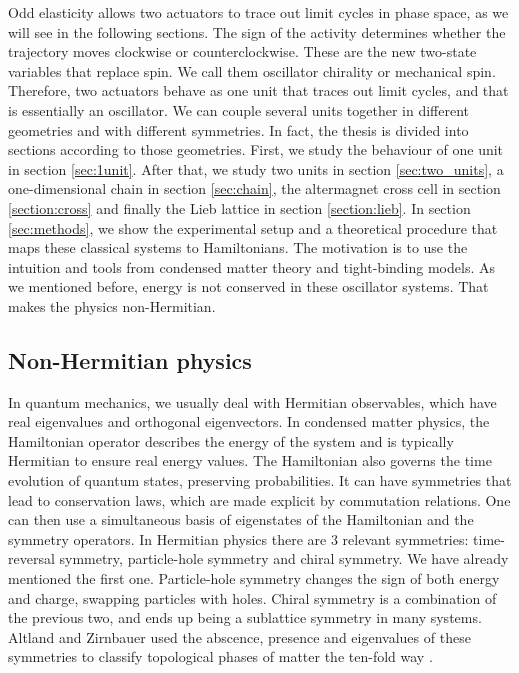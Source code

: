 \documentclass[11pt, a4paper]{article} %
\begin{document}
Odd elasticity allows two actuators to trace out limit cycles in phase space, as we will see in the following sections.
The sign of the activity determines whether the trajectory moves clockwise or counterclockwise. 
These are the new two-state variables that replace spin. We call them oscillator chirality or mechanical spin.
Therefore, two actuators behave as one unit that traces out limit cycles, and that is essentially an oscillator. 
We can couple several units together in different geometries and with different symmetries. 
In fact, the thesis is divided into sections according to those geometries. 
First, we study the behaviour of one unit in section \ref{sec:1unit}.
After that, we study two units in section \ref{sec:two_units}, a one-dimensional chain in section \ref{sec:chain}, 
the altermagnet cross cell in section \ref{section:cross} and finally the Lieb lattice in section \ref{section:lieb}.
In section \ref{sec:methods}, we show the experimental setup and a theoretical procedure 
that maps these classical systems to Hamiltonians. 
The motivation is to use the intuition and tools from condensed matter theory and tight-binding models. 
As we mentioned before, energy is not conserved in these oscillator systems. That makes the physics non-Hermitian. 

\subsection{Non-Hermitian physics}
\label{subsec:nonHermitian}

In quantum mechanics, we usually deal with Hermitian observables, which have real eigenvalues and orthogonal eigenvectors.
In condensed matter physics, the Hamiltonian operator describes the energy of the system and is typically Hermitian to ensure real energy values. 
The Hamiltonian also governs the time evolution of quantum states, preserving probabilities. It can have symmetries that lead to conservation laws, 
which are made explicit by commutation relations. One can then use a simultaneous basis of eigenstates of the Hamiltonian and the symmetry operators.
In Hermitian physics there are 3 relevant symmetries: time-reversal symmetry, particle-hole symmetry and chiral symmetry. 
We have already mentioned the first one. Particle-hole symmetry changes the sign of both energy and charge, swapping particles with holes.
Chiral symmetry is a combination of the previous two, and ends up being a sublattice symmetry in many systems. 
Altland and Zirnbauer used the abscence, presence and eigenvalues of these symmetries to classify topological phases of matter the ten-fold way 
\cite{Altland_1997}.
\end{document}
